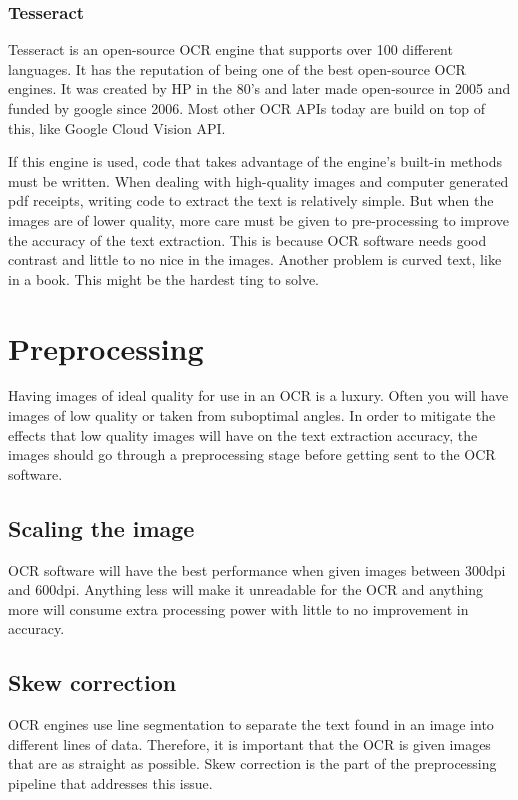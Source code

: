 \subsubsection{Tesseract}\label{subsubsec:Tesseract}
Tesseract is an open-source OCR engine that supports over 100 different languages.
It has the reputation of being one of the best open-source OCR engines.
It was created by HP in the 80's and later made open-source in 2005 and funded by google since 2006.
Most other OCR APIs today are build on top of this, like Google Cloud Vision API.

If this engine is used, code that takes advantage of the engine's built-in methods must be written.
When dealing with high-quality images and computer generated pdf receipts, writing code to extract the text is relatively simple.
But when the images are of lower quality, more care must be given to pre-processing to improve the accuracy of the text extraction.
This is because OCR software needs good contrast and little to no nice in the images.
Another problem is curved text, like in a book.
This might be the hardest ting to solve.

\section{Preprocessing}\label{sec:preprocessing}
Having images of ideal quality for use in an OCR is a luxury.
Often you will have images of low quality or taken from suboptimal angles.
In order to mitigate the effects that low quality images will have on the text extraction accuracy, the images should go through a preprocessing stage before getting sent to the OCR software.

\subsection{Scaling the image}\label{subsec:scaling-the-image}
OCR software will have the best performance when given images between 300dpi and 600dpi.
Anything less will make it unreadable for the OCR and anything more will consume extra processing power with little to no improvement in accuracy.

\subsection{Skew correction}\label{subsec:skew-correction}
OCR engines use line segmentation to separate the text found in an image into different lines of data.
Therefore, it is important that the OCR is given images that are as straight as possible.
Skew correction is the part of the preprocessing pipeline that addresses this issue.

